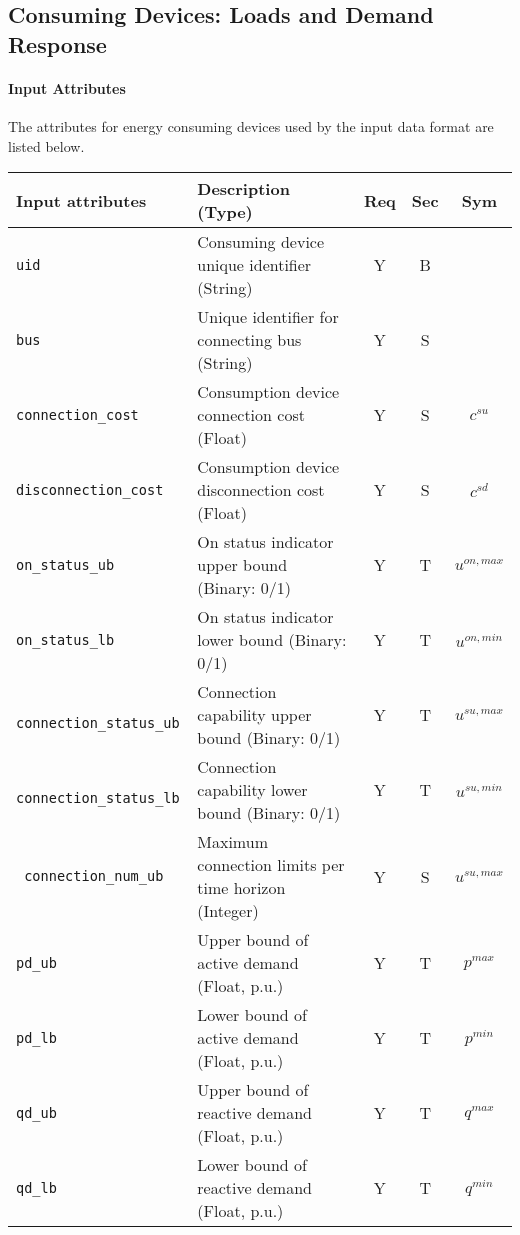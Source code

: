 \documentclass{article}
\begin{document}
\subsection{Consuming Devices: Loads and Demand Response}
\label{nom:load}
\paragraph{Input Attributes} The attributes for energy consuming devices used by the input data format are listed below.

\begin{center}
\small
\begin{tabular}{ l | l | c | c | c |}
Input attributes & Description (Type) & Req & Sec & Sym\\
\hline
  {\tt uid} & Consuming device unique identifier (String) & Y & B &  \\
  {\tt bus} & Unique identifier for connecting bus (String)& Y & S & \\
  {\tt connection\_cost} & Consumption device connection cost (Float) & Y & S & $c^{su}$\\
  {\tt disconnection\_cost} & Consumption device disconnection cost (Float) & Y & S & $c^{sd}$\\  
  {\tt on\_status\_ub} & On status indicator upper bound (Binary: 0/1) & Y & T & $u^{on,max}$\\
  {\tt on\_status\_lb} & On status indicator lower bound (Binary: 0/1) & Y & T & $u^{on,min}$\\
  {\tt\color{red} connection\_status\_ub} & Connection capability  upper bound (Binary: 0/1) & Y & T & $u^{su,max}$\\
  {\tt\color{red} connection\_status\_lb} & Connection capability lower bound (Binary: 0/1) & Y & T & $u^{su,min}$\\
  {\tt\color{red} connection\_num\_ub} & Maximum connection limits per time horizon (Integer) & Y & S & $u^{su,max}$\\  
  {\tt pd\_ub} & Upper bound of active demand (Float, p.u.) & Y & T & $p^{max}$ \\
  {\tt pd\_lb} & Lower bound of active demand (Float, p.u.) & Y & T & $p^{min}$ \\
  {\tt qd\_ub} & Upper bound of reactive demand (Float, p.u.)& Y & T & $q^{max}$\\
  {\tt qd\_lb} & Lower bound of reactive demand (Float, p.u.)& Y & T & $q^{min}$\\ 


\end{tabular}
\end{center}
\end{document}
